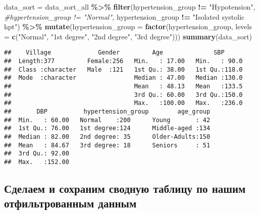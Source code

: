 \documentclass[
]{article}
\newenvironment{Shaded}{\begin{snugshade}}{\end{snugshade}}
\newcommand{\AttributeTok}[1]{\textcolor[rgb]{0.13,0.29,0.53}{#1}}
\newcommand{\CommentTok}[1]{\textcolor[rgb]{0.56,0.35,0.01}{\textit{#1}}}
\newcommand{\FunctionTok}[1]{\textcolor[rgb]{0.13,0.29,0.53}{\textbf{#1}}}
\newcommand{\NormalTok}[1]{#1}
\newcommand{\OtherTok}[1]{\textcolor[rgb]{0.56,0.35,0.01}{#1}}
\newcommand{\SpecialCharTok}[1]{\textcolor[rgb]{0.81,0.36,0.00}{\textbf{#1}}}
\newcommand{\StringTok}[1]{\textcolor[rgb]{0.31,0.60,0.02}{#1}}
\begin{document}
\begin{Shaded}
\begin{Highlighting}[]
\NormalTok{data\_sort }\OtherTok{=}\NormalTok{ data\_sort\_all }\SpecialCharTok{\%\textgreater{}\%} \FunctionTok{filter}\NormalTok{(hypertension\_group }\SpecialCharTok{!=} \StringTok{"Hypotension"}\NormalTok{, }
         \CommentTok{\#hypertension\_group != "Normal", }
\NormalTok{         hypertension\_group }\SpecialCharTok{!=} \StringTok{"Isolated systolic hpt"}\NormalTok{) }\SpecialCharTok{\%\textgreater{}\%} 
  \FunctionTok{mutate}\NormalTok{(}\AttributeTok{hypertension\_group =} \FunctionTok{factor}\NormalTok{(hypertension\_group, }
                                     \AttributeTok{levels =} \FunctionTok{c}\NormalTok{(}\StringTok{"Normal"}\NormalTok{,}
                                                \StringTok{"1st degree"}\NormalTok{, }
                                                \StringTok{"2nd degree"}\NormalTok{, }
                                                \StringTok{"3rd degree"}\NormalTok{)))}
\FunctionTok{summary}\NormalTok{(data\_sort)}
\end{Highlighting}
\end{Shaded}

\begin{verbatim}
##    Village             Gender         Age              SBP       
##  Length:377         Female:256   Min.   : 17.00   Min.   : 90.0  
##  Class :character   Male  :121   1st Qu.: 38.00   1st Qu.:118.0  
##  Mode  :character                Median : 47.00   Median :130.0  
##                                  Mean   : 48.13   Mean   :133.5  
##                                  3rd Qu.: 60.00   3rd Qu.:150.0  
##                                  Max.   :100.00   Max.   :236.0  
##       DBP          hypertension_group        age_group  
##  Min.   : 60.00   Normal    :200      Young       : 42  
##  1st Qu.: 76.00   1st degree:124      Middle-aged :134  
##  Median : 82.00   2nd degree: 35      Older-Adults:150  
##  Mean   : 84.67   3rd degree: 18      Seniors     : 51  
##  3rd Qu.: 92.00                                         
##  Max.   :152.00
\end{verbatim}

\subsection{Сделаем и сохраним сводную таблицу по нашим отфильтрованным
данным}\label{ux441ux434ux435ux43bux430ux435ux43c-ux438-ux441ux43eux445ux440ux430ux43dux438ux43c-ux441ux432ux43eux434ux43dux443ux44e-ux442ux430ux431ux43bux438ux446ux443-ux43fux43e-ux43dux430ux448ux438ux43c-ux43eux442ux444ux438ux43bux44cux442ux440ux43eux432ux430ux43dux43dux44bux43c-ux434ux430ux43dux43dux44bux43c}
\end{document}

